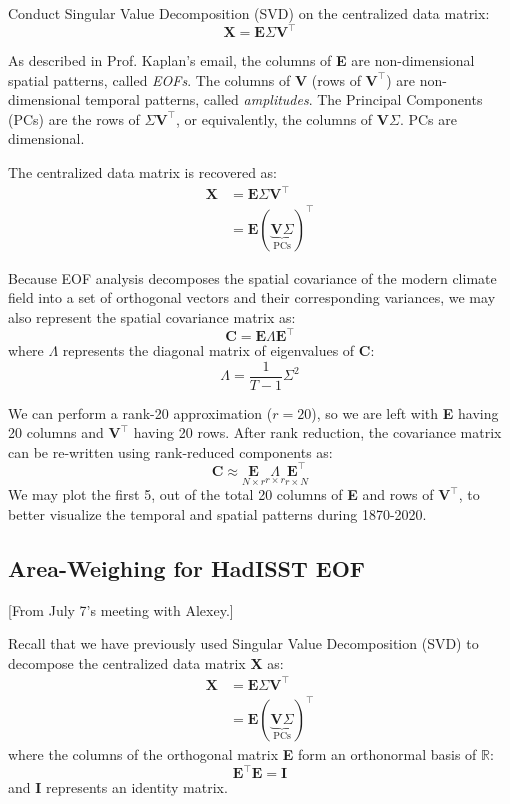 \documentclass{article}
\begin{document}
Conduct Singular Value Decomposition (SVD) on the centralized data matrix:
$$\textbf{X} = \textbf{E} \Sigma \textbf{V}^\intercal$$

As described in Prof. Kaplan's email, the columns of \textbf{E} are non-dimensional spatial patterns, called \textit{EOFs}. The columns of \textbf{V} (rows of $\textbf{V}^\intercal$) are non-dimensional temporal patterns, called \textit{amplitudes}. The Principal Components (PCs) are the rows of $\Sigma \textbf{V}^\intercal$, or equivalently, the columns of $\textbf{V}\Sigma$. PCs are dimensional.

The centralized data matrix is recovered as:
\begin{align*}
    \textbf{X} &= \textbf{E} \Sigma \textbf{V}^\intercal \\
    &= \textbf{E}{(\underbrace{\textbf{V}\Sigma}_{\text{PCs}})}^\intercal
\end{align*}

Because EOF analysis decomposes the spatial covariance of the modern climate field into a set of orthogonal vectors and their corresponding variances, we may also represent the spatial covariance matrix as:
$$\textbf{C} = \textbf{E} \Lambda \textbf{E}^\intercal$$
where $\Lambda$ represents the diagonal matrix of eigenvalues of \textbf{C}:
$$\Lambda = \frac{1}{T-1}\Sigma^2$$

We can perform a rank-20 approximation ($r=20$), so we are left with \textbf{E} having 20 columns and $\textbf{V}^\intercal$ having 20 rows. After rank reduction, the covariance matrix can be re-written using rank-reduced components as:
$$\textbf{C} \approx \underset{N \times r}{\textbf{E}} \underset{r \times r}{\Lambda} \underset{r \times N}{\textbf{E}^\intercal}$$
We may plot the first 5, out of the total 20 columns of \textbf{E} and rows of $\textbf{V}^\intercal$, to better visualize the temporal and spatial patterns during 1870-2020.


\subsection{Area-Weighing for HadISST EOF}
\color{purple} [From July 7's meeting with Alexey.] \color{black}

Recall that we have previously used Singular Value Decomposition (SVD) to decompose the centralized data matrix \textbf{X} as:
\begin{align*}
    \textbf{X} &= \textbf{E} \Sigma \textbf{V}^\intercal \\
    &= \textbf{E}{(\underbrace{\textbf{V}\Sigma}_{\text{PCs}})}^\intercal
\end{align*}
where the columns of the orthogonal matrix \textbf{E} form an orthonormal basis of $\mathbb{R}$:
$$\textbf{E}^\intercal \textbf{E} = \textbf{I}$$
and \textbf{I} represents an identity matrix.
\end{document}
